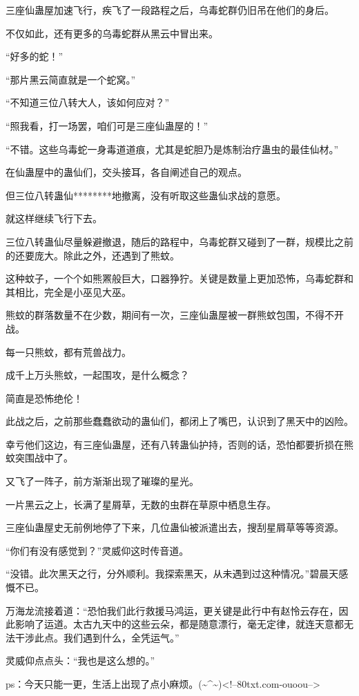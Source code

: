 \begin{this_body}
三座仙蛊屋加速飞行，疾飞了一段路程之后，乌毒蛇群仍旧吊在他们的身后。

不仅如此，还有更多的乌毒蛇群从黑云中冒出来。

“好多的蛇！”

“那片黑云简直就是一个蛇窝。”

“不知道三位八转大人，该如何应对？”

“照我看，打一场罢，咱们可是三座仙蛊屋的！”

“不错。这些乌毒蛇一身毒道道痕，尤其是蛇胆乃是炼制治疗蛊虫的最佳仙材。”

在仙蛊屋中的蛊仙们，交头接耳，各自阐述自己的观点。

但三位八转蛊仙********地撤离，没有听取这些蛊仙求战的意愿。

就这样继续飞行下去。

三位八转蛊仙尽量躲避撤退，随后的路程中，乌毒蛇群又碰到了一群，规模比之前的还要庞大。除此之外，还遇到了熊蚊。

这种蚊子，一个个如熊罴般巨大，口器狰狞。关键是数量上更加恐怖，乌毒蛇群和其相比，完全是小巫见大巫。

熊蚊的群落数量不在少数，期间有一次，三座仙蛊屋被一群熊蚊包围，不得不开战。

每一只熊蚊，都有荒兽战力。

成千上万头熊蚊，一起围攻，是什么概念？

简直是恐怖绝伦！

此战之后，之前那些蠢蠢欲动的蛊仙们，都闭上了嘴巴，认识到了黑天中的凶险。

幸亏他们这边，有三座仙蛊屋，还有八转蛊仙护持，否则的话，恐怕都要折损在熊蚊突围战中了。

又飞了一阵子，前方渐渐出现了璀璨的星光。

一片黑云之上，长满了星屑草，无数的虫群在草原中栖息生存。

三座仙蛊屋史无前例地停了下来，几位蛊仙被派遣出去，搜刮星屑草等等资源。

“你们有没有感觉到？”灵威仰这时传音道。

“没错。此次黑天之行，分外顺利。我探索黑天，从未遇到过这种情况。”碧晨天感慨不已。

万海龙流接着道：“恐怕我们此行救援马鸿运，更关键是此行中有赵怜云存在，因此影响了运道。太古九天中的这些云朵，都是随意漂行，毫无定律，就连天意都无法干涉此点。我们遇到什么，全凭运气。”

灵威仰点点头：“我也是这么想的。”

ps：今天只能一更，生活上出现了点小麻烦。(\~{}\^{}\~{})<!--80txt.com-ouoou-->

\end{this_body}

